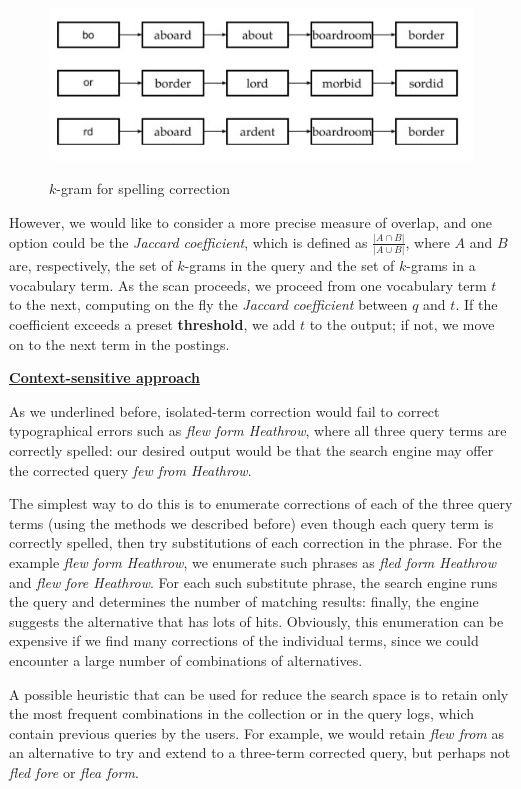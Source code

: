 \begin{figure}[h!]
		\centering
		\includegraphics[scale = 1.6]{img/kgram spelling.jpg}
		\label{kgram_spelling}
        \caption{$k$-gram for spelling correction}
\end{figure}

However, we would like to consider a more precise measure of overlap, and one option could be the \textit{Jaccard coefficient}, which is defined as $\frac{|A \cap B|}{|A \cup B|}$, where $A$ and $B$ are, respectively, the set of $k$-grams in the query and the set of $k$-grams in a vocabulary term. As the scan proceeds, we proceed from one vocabulary term $t$ to the next, computing on the fly the \textit{Jaccard coefficient} between $q$ and $t$. If the coefficient exceeds a preset \textbf{threshold}, we add $t$ to the output; if not, we move on to the next term in the postings.

\underline{\textbf{Context-sensitive approach}}

As we underlined before, isolated-term correction would fail to correct typographical errors such as \textit{flew form Heathrow}, where all three query terms are correctly spelled: our desired output would be that the search engine may offer the corrected query \textit{few from Heathrow}. 

The simplest way to do this is to enumerate corrections of each of the three query terms (using the methods we described before) even though each query term is correctly spelled, then try substitutions of each correction in the phrase. For the example \textit{flew form Heathrow}, we enumerate such phrases as \textit{fled form Heathrow} and \textit{flew fore Heathrow}. For each such substitute phrase, the search engine runs the query and determines the number of matching results: finally, the engine suggests the alternative that has lots of hits. Obviously, this enumeration can be expensive if we find many corrections of the individual terms, since we could encounter a large number of combinations of alternatives.

A possible heuristic that can be used for reduce the search space is to retain only the most frequent combinations in the collection or in the query logs, which contain previous queries by the users. For example, we would retain \textit{flew from} as an alternative to try and extend to a three-term corrected query, but perhaps not \textit{fled fore} or \textit{flea form}.

